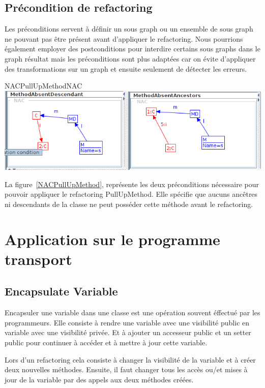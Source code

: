 \documentclass[a4paper, 12pt]{article}
\begin{document}
  \subsection{Précondition de refactoring}
  Les préconditions servent à définir un sous graph ou un ensemble de sous graph ne pouvant pas être présent avant d'appliquer le refactoring.
  Nous pourrions également employer des postconditions pour interdire certains sous graphs dans le graph résultat
  mais les préconditions sont plus adaptées car on évite d'appliquer des transformations sur un graph et ensuite seulement de détecter les erreurs.

  \begin{myfig}{NACPullUpMethod}{NAC}
    \includegraphics[width=\textwidth]{NACPullUpMethod.png}
  \end{myfig}

  La figure~\ref{NACPullUpMethod}, représente les deux préconditions nécessaire pour pouvoir appliquer le refactoring PullUpMethod.
  Elle spécifie que aucuns ancêtres ni descendants de la classe ne peut posséder cette méthode avant le refactoring.


  \section{Application sur le programme transport}

  \subsection{Encapsulate Variable}

  Encapsuler une variable dans une classe est une opération souvent éffectué par les programmeurs.
  Elle consiste à rendre une variable avec une visibilité public en variable avec une visibilité privée.
  Et à ajouter un accesseur public et un setter public pour continuer à accéder et à mettre à jour cette variable.

  Lors d'un refactoring cela consiste à changer la visibilité de la variable et à créer deux nouvelles méthodes.
  Ensuite, il faut changer tous les accès ou/et mises à jour de la variable par des appels aux deux méthodes créées.
\end{document}

